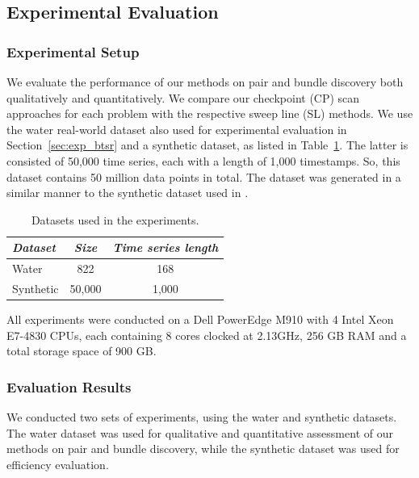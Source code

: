 
\subsection{Experimental Evaluation}
\label{subsec:local_sim_join_exp}

\graphicspath{{Papers/SSTD2019/}{Papers/SIGSpatial2019/}}

\subsubsection{Experimental Setup}
\label{subsec:evaluation_setup_join}
We evaluate the performance of our methods on pair and bundle discovery both qualitatively and quantitatively. We compare our checkpoint (CP) scan approaches for each problem with the respective sweep line (SL) methods. We use the water real-world dataset also used for experimental evaluation in Section~\ref{sec:exp_btsr} and a synthetic dataset, as listed in Table~\ref{tab:datasets_join}. The latter is consisted of 50,000 time series, each with a length of 1,000 timestamps. So, this dataset contains 50 million data points in total. The dataset was generated in a similar manner to the synthetic dataset used in \cite{keogh1999indexing}.

\begin{table}[ht]
\centering
\caption{Datasets used in the experiments.}
\begin{small}
\begin{tabular}{lcc} 
\hline
{\em Dataset} & {\em Size} & {\em Time series length} \\
\hline
Water & 822 & 168  \\
Synthetic & 50,000 & 1,000 \\
\hline
\end{tabular}
\end{small}
\label{tab:datasets_join}
\end{table}

All experiments were conducted on a Dell PowerEdge M910 with 4 Intel Xeon E7-4830 CPUs, each containing 8 cores clocked at 2.13GHz, 256 GB RAM and a total storage space of 900 GB.

\subsubsection{Evaluation Results}
\label{subsec:exp_results}
We conducted two sets of experiments, using the water and synthetic datasets. The water dataset was used for qualitative and quantitative assessment of our methods on pair and bundle discovery, while the synthetic dataset was used for efficiency evaluation.

